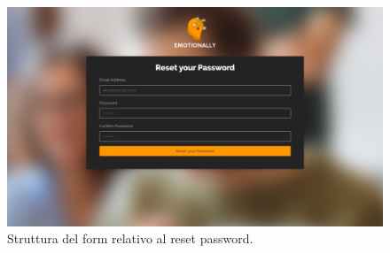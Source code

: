 \begin{figure}[H]
	\centering
	\caption{Struttura del form relativo al reset password.}
	\label{fig:struttura-form:reset-password}
	\includegraphics[width=\textwidth]{images/struttura-form/form-reset-password}
\end{figure}

